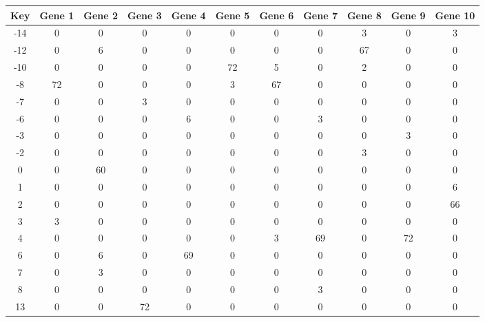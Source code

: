 \begin{tabular}{|c|c|c|c|c|c|c|c|c|c|c|}
\hline
Key & Gene 1 & Gene 2 & Gene 3 & Gene 4 & Gene 5 & Gene 6 & Gene 7 & Gene 8 & Gene 9 & Gene 10 \\
\hline
-14 & 0 & 0 & 0 & 0 & 0 & 0 & 0 & 3 & 0 & 3 \\
-12 & 0 & 6 & 0 & 0 & 0 & 0 & 0 & 67 & 0 & 0 \\
-10 & 0 & 0 & 0 & 0 & 72 & 5 & 0 & 2 & 0 & 0 \\
-8 & 72 & 0 & 0 & 0 & 3 & 67 & 0 & 0 & 0 & 0 \\
-7 & 0 & 0 & 3 & 0 & 0 & 0 & 0 & 0 & 0 & 0 \\
-6 & 0 & 0 & 0 & 6 & 0 & 0 & 3 & 0 & 0 & 0 \\
-3 & 0 & 0 & 0 & 0 & 0 & 0 & 0 & 0 & 3 & 0 \\
-2 & 0 & 0 & 0 & 0 & 0 & 0 & 0 & 3 & 0 & 0 \\
0 & 0 & 60 & 0 & 0 & 0 & 0 & 0 & 0 & 0 & 0 \\
1 & 0 & 0 & 0 & 0 & 0 & 0 & 0 & 0 & 0 & 6 \\
2 & 0 & 0 & 0 & 0 & 0 & 0 & 0 & 0 & 0 & 66 \\
3 & 3 & 0 & 0 & 0 & 0 & 0 & 0 & 0 & 0 & 0 \\
4 & 0 & 0 & 0 & 0 & 0 & 3 & 69 & 0 & 72 & 0 \\
6 & 0 & 6 & 0 & 69 & 0 & 0 & 0 & 0 & 0 & 0 \\
7 & 0 & 3 & 0 & 0 & 0 & 0 & 0 & 0 & 0 & 0 \\
8 & 0 & 0 & 0 & 0 & 0 & 0 & 3 & 0 & 0 & 0 \\
13 & 0 & 0 & 72 & 0 & 0 & 0 & 0 & 0 & 0 & 0 \\
\hline
\end{tabular}